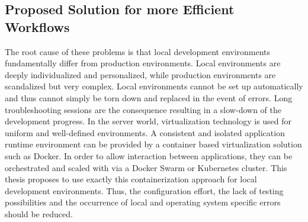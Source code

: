         \subsection{Proposed Solution for more Efficient Workflows}
        The root cause of these problems is that local development environments fundamentally differ from production environments. Local environments are deeply individualized and personalized, while production environments are scandalized but very complex. Local environments cannot be set up automatically and thus cannot simply be torn down and replaced in the event of errors. Long troubleshooting sessions are the consequence resulting in a slow-down of the development progress.\newline
        In the server world, virtualization technology is used for uniform and well-defined environments. A consistent and isolated application runtime environment can be provided by a container based virtualization solution such as Docker. In order to allow interaction between applications, they can be orchestrated and scaled with via a Docker Swarm or Kubernetes cluster.\newline
        This thesis proposes to use exactly this containerization approach for local development environments. Thus, the configuration effort, the lack of testing possibilities and the occurrence of local and operating system specific errors should be reduced.
